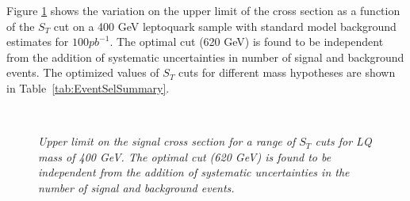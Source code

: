 Figure \ref{fig:optimization} shows the variation on the upper limit of the cross section as a function of 
the $S_T$ cut on a 400 GeV leptoquark sample with standard model background estimates for $100 pb^{-1}$.  
The optimal cut (620 GeV) is found to be independent from the addition 
of systematic uncertainties in number of signal and background events.
The optimized values of $S_{T}$ cuts for different mass hypotheses are shown in Table~\ref{tab:EventSelSummary}. 
%
\begin{figure}[htbp]
  \begin{center}
       \\
    \caption{\small \sl Upper limit on the signal cross section for a range of $S_T$ cuts for LQ mass of 400 GeV. 
      The optimal cut (620 GeV) is found to be independent from the addition of systematic uncertainties in the 
      number of signal and background events.}
    \label{fig:optimization}
  \end{center}
\end{figure}
%

%
